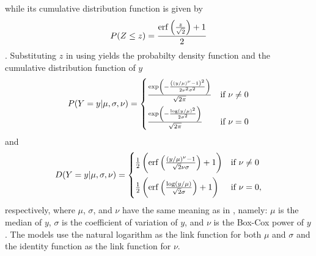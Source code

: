 while its cumulative distribution function is given by
\begin{equation}
  \label{eq:StandardNormalDistributionCDF}
  P(Z \leq z) =
  \frac{\operatorname{erf}\left(\frac{z}{\sqrt{2}}\right) + 1}{2}
  \end{equation}
\parencite{Henze2013,Weisstein2017c}.  Substituting \(z\) in  using  yields the probabilty density function and the cumulative distribution function of \(y\)
\begin{equation}
  \label{eq:BoxCoxColeGreenDistributionPDF}
  P(Y = y|\mu, \sigma, \nu) =
  \begin{cases}
    \frac{\exp\left(-\frac{\left(\left(y \middle/ \mu\right)^\nu - 1\right)^2}{2 \nu^2 \sigma^2}\right)}{\sqrt{2 \pi}} &\text{if } \nu \not = 0 \vspace{0.5em} \\
    \frac{\exp\left(-\frac{\log\left(y \middle/ \mu\right)^2}{2 \sigma^2}\right)}{\sqrt{2 \pi}} &\text{if } \nu = 0
  \end{cases}
\end{equation}
and
\begin{equation}
  \label{eq:BoxCoxColeGreenDistributionCDF}
  D(Y = y|\mu, \sigma, \nu) =
  \begin{cases}
    \frac{1}{2} \left(\erf\left(\frac{\left( y \middle/ \mu \right)^\nu - 1}{\sqrt{2} \nu \sigma}\right) + 1\right) &\text{if } \nu \not = 0 \vspace{0.5em} \\
    \frac{1}{2} \left(\erf\left(\frac{\log\left( y \middle/ \mu \right)}{\sqrt{2} \sigma}\right) + 1\right) &\text{if } \nu = 0,
  \end{cases}
\end{equation}
respectively, where \(\mu\), \(\sigma\), and \(\nu\) have the same meaning as in , namely: \(\mu\) is the median of \(y\), \(\sigma\) is the coefficient of variation of \(y\), and \(\nu\) is the Box-Cox power of \(y\).  The models use the natural logarithm as the link function for both \(\mu\) and \(\sigma\) and the identity function as the link function for \(\nu\).

